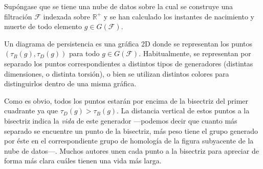 \documentclass[12pt,a4paper,twoside]{article} %
\theoremstyle{plain}
\theoremstyle{definition}
\newcommand{\R}{\mathbb{R}}
\begin{document}
Supóngase que se tiene una nube de datos sobre la cual se construye una filtración $\mathcal{F}$ indexada sobre $\R^+$ y se han calculado los instantes de nacimiento y muerte de todo elemento $g \in G(\mathcal{F})$.

Un diagrama de persistencia es una gráfica 2D donde se representan los puntos $(\tau_B(g), \tau_D(g))$ para todo $g \in G(\mathcal{F})$. Habitualmente, se representan por separado los puntos correspondientes a distintos tipos de generadores (distintas dimensiones, o distinta torsión), o bien se utilizan distintos colores para distinguirlos dentro de una misma gráfica.

Como es obvio, todos los puntos estarán por encima de la bisectriz del primer cuadrante ya que $\tau_D(g) > \tau_B(g)$. La distancia vertical de estos puntos a la bisectriz indica la \emph{vida} de este generador ---podemos decir que cuanto más separado se encuentre un punto de la bisectriz, más peso tiene el grupo generado por éste en el correspondiente grupo de homología de la figura subyacente de la nube de datos---. Muchos autores unen cada punto a la bisectriz para apreciar de forma más clara cuáles tienen una vida más larga.
\end{document}
